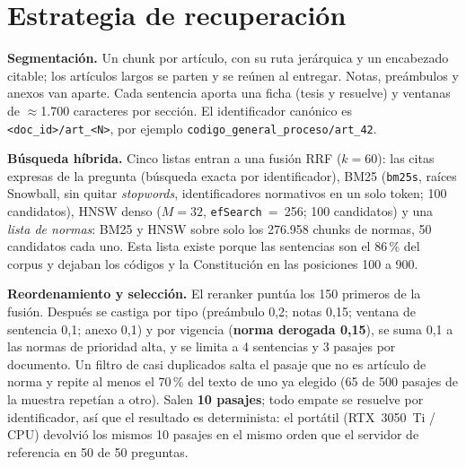 \documentclass[10pt,twocolumn,letterpaper]{article}
\newcommand{\cod}[1]{\texttt{#1}}
\begin{document}
\section{Estrategia de recuperación}

\textbf{Segmentación.} Un chunk por artículo, con su ruta jerárquica y un encabezado
citable; los artículos largos se parten y se reúnen al entregar. Notas, preámbulos y
anexos van aparte. Cada sentencia aporta una ficha (tesis y resuelve) y ventanas de
$\approx$1.700 caracteres por sección. El identificador canónico es
\cod{<doc\_id>/art\_<N>}, por ejemplo \cod{codigo\_general\_proceso/art\_42}.

\textbf{Búsqueda híbrida.} Cinco listas entran a una fusión RRF ($k=60$): las citas
expresas de la pregunta (búsqueda exacta por identificador), BM25 (\cod{bm25s}, raíces
Snowball, sin quitar \emph{stopwords}, identificadores normativos en un solo token; 100
candidatos), HNSW denso ($M=32$, \cod{efSearch}~=~256; 100 candidatos) y una
\emph{lista de normas}: BM25 y HNSW sobre solo los 276.958 chunks de normas, 50
candidatos cada uno. Esta lista existe porque las sentencias son el 86\,\% del corpus y
dejaban los códigos y la Constitución en las posiciones 100 a 900.

\textbf{Reordenamiento y selección.} El reranker puntúa los 150 primeros de la fusión.
Después se castiga por tipo (preámbulo 0,2; notas 0,15; ventana de sentencia 0,1; anexo
0,1) y por vigencia (\textbf{norma derogada 0,15}), se suma 0,1 a las normas de
prioridad alta, y se limita a 4 sentencias y 3 pasajes por documento. Un filtro de
casi duplicados salta el pasaje que no es artículo de norma y repite al menos el 70\,\%
del texto de uno ya elegido (65 de 500 pasajes de la muestra repetían a otro). Salen
\textbf{10 pasajes}; todo empate se resuelve por identificador, así que el resultado es
determinista: el portátil (RTX~3050~Ti / CPU) devolvió los mismos 10 pasajes en el mismo
orden que el servidor de referencia en 50 de 50 preguntas.
\end{document}
